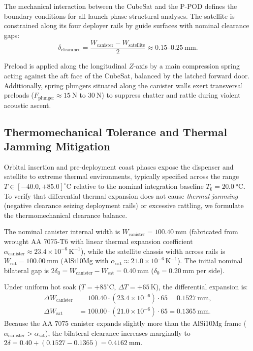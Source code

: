 The mechanical interaction between the CubeSat and the P-POD defines the boundary conditions for all launch-phase structural analyses. The satellite is constrained along its four deployer rails by guide surfaces with nominal clearance gaps:
\begin{equation}
\delta_{\text{clearance}} = \frac{W_{\text{canister}} - W_{\text{satellite}}}{2} \approx 0.15\text{--}\SI{0.25}{\milli\meter}.
\label{eq:rail_clearance}
\end{equation}

Preload is applied along the longitudinal $Z$-axis by a main compression spring acting against the aft face of the CubeSat, balanced by the latched forward door. Additionally, spring plungers situated along the canister walls exert transversal preloads ($F_{\text{plunger}} \approx \SI{15}{\newton}$ to $\SI{30}{\newton}$) to suppress chatter and rattle during violent acoustic ascent.

\subsection{Thermomechanical Tolerance and Thermal Jamming Mitigation}
\label{subsec:thermal_clearance}

Orbital insertion and pre-deployment coast phases expose the dispenser and satellite to extreme thermal environments, typically specified across the range $T \in [-40.0, +85.0]^\circ\text{C}$ relative to the nominal integration baseline $T_0 = \SI{20.0}{\celsius}$. To verify that differential thermal expansion does not cause \textit{thermal jamming} (negative clearance seizing deployment rails) or excessive rattling, we formulate the thermomechanical clearance balance.

The nominal canister internal width is $W_{\text{canister}} = \SI{100.40}{\milli\meter}$ (fabricated from wrought AA 7075-T6 with linear thermal expansion coefficient $\alpha_{\text{canister}} \approx 23.4 \times 10^{-6}\,\text{K}^{-1}$), while the satellite chassis width across rails is $W_{\text{sat}} = \SI{100.00}{\milli\meter}$ (AlSi10Mg with $\alpha_{\text{sat}} \approx 21.0 \times 10^{-6}\,\text{K}^{-1}$). The initial nominal bilateral gap is $2\delta_0 = W_{\text{canister}} - W_{\text{sat}} = \SI{0.40}{\milli\meter}$ ($\delta_0 = \SI{0.20}{\milli\meter}$ per side).

Under uniform hot soak ($T = +85^\circ\text{C}$, $\Delta T = +65\,\text{K}$), the differential expansion is:
\begin{align}
\Delta W_{\text{canister}} &= 100.40 \cdot (23.4 \times 10^{-6}) \cdot 65 = \SI{0.1527}{\milli\meter}, \\
\Delta W_{\text{sat}} &= 100.00 \cdot (21.0 \times 10^{-6}) \cdot 65 = \SI{0.1365}{\milli\meter}.
\end{align}
Because the AA 7075 canister expands slightly more than the AlSi10Mg frame ($\alpha_{\text{canister}} > \alpha_{\text{sat}}$), the bilateral clearance increases marginally to $2\delta = 0.40 + (0.1527 - 0.1365) = \SI{0.4162}{\milli\meter}$.

